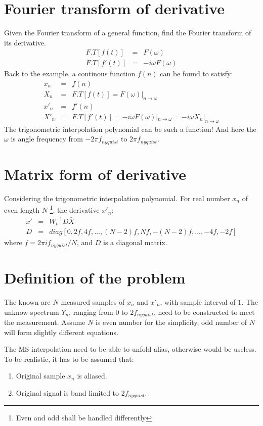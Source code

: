 \documentclass[12pt]{article}
\begin{document}
\section{Fourier transform of derivative}

Given the Fourier transform of a general function, find the Fourier transform of its derivative.
\begin{eqnarray}
    F.T[f(t)]  &=& F(\omega)   \\
    F.T[f'(t)] &=& -i\omega F(\omega)
\end{eqnarray}
Back to the example, a continous function $f(n)$ can be found to satisfy:
\begin{eqnarray}
    x_n  &=& f(n)    \\
    X_n  &=& F.T[f(t)] = F(\omega)|_{n \to \omega} \\
    x'_n &=& f'(n) \\
    X'_n &=& F.T[f'(t)] = -i\omega F(\omega)|_{n\to \omega} = -i\omega X_n|_{n\to \omega} 
\end{eqnarray}
The trigonometric interpolation polynomial can be such a function! And here the $\omega$ is 
angle frequency from $-2\pi f_{nyquist}$ to $2\pi f_{nyquist}$.


\section{Matrix form of derivative}
Considering the trigonometric interpolation polynomial. For real number $x_n$ of even length $N$
\footnote{Even and odd shall be handled differently}, the derivative $x'_n$:
\begin{eqnarray}
    \bar{x'} & = & W_t^{-1} D \bar{X} \\
    D &= & diag[0, 2f, 4f, \ldots, (N-2)f, Nf, -(N-2)f, \ldots, -4f, -2f]
\end{eqnarray}
where $f=2\pi if_{nyquist}/N$, and $D$ is a diagonal matrix.

\section{Definition of the problem}
The known are $N$ measured samples of  $x_n$ and $x'_n$, with sample interval of $1$.
The unknow spectrum $Y_n$, ranging from $0$ to $2f_{nyquist}$, need to be constructed to meet the measurement.
Assume $N$ is even number for the simplicity, odd number of $N$ will form slightly different equations.

The MS interpolation need to be able to unfold alias, otherwise would be useless. 
To be realistic, it has to be assumed that:
\begin{enumerate}
    \item Original sample $x_n$ is aliased.
    \item Original signal is band limited to $2f_{nyquist}$.
\end{enumerate}
\end{document}
